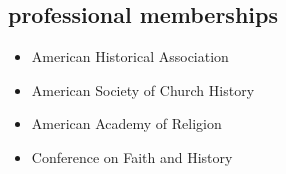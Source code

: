 \documentclass[11pt]{article}
\providecommand{\tightlist}{%
  \setlength{\itemsep}{0pt}\setlength{\parskip}{0pt}}
\begin{document}

\subsection{professional memberships}\label{professional-memberships}

\begin{itemize}
    \tightlist
  \item
    American Historical Association
  \item
    American Society of Church History
  \item
    American Academy of Religion
  \item
    Conference on Faith and History
\end{itemize}
\end{document}

